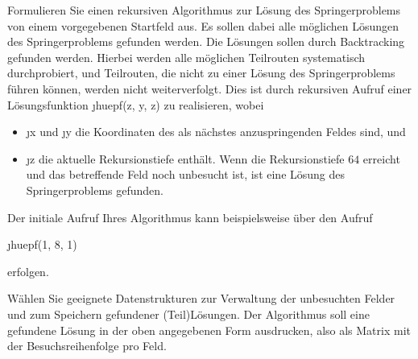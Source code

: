 \documentclass{bschlangaul-aufgabe}
\begin{document}
\noindent
Formulieren Sie einen rekursiven Algorithmus zur Lösung des
Springerproblems von einem vorgegebenen Startfeld aus. Es sollen dabei
alle möglichen Lösungen des Springerproblems gefunden werden. Die
Lösungen sollen durch Backtracking gefunden werden. Hierbei werden alle
möglichen Teilrouten systematisch durchprobiert, und Teilrouten, die
nicht zu einer Lösung des Springerproblems führen können, werden nicht
weiterverfolgt. Dies ist durch rekursiven Aufruf einer Lösungsfunktion
\j{huepf(z, y, z)} zu realisieren, wobei

\begin{itemize}

\item \j{x} und \j{y} die Koordinaten des als nächstes anzuspringenden
Feldes sind, und

\item \j{z} die aktuelle Rekursionstiefe enthält. Wenn die
Rekursionstiefe $64$ erreicht und das betreffende Feld noch unbesucht ist,
ist eine Lösung des Springerproblems gefunden.
\end{itemize}

Der initiale Aufruf Ihres Algorithmus kann beispielsweise über den
Aufruf

\begin{center}
\j{huepf(1, 8, 1)}
\end{center}

erfolgen.

Wählen Sie geeignete Datenstrukturen zur Verwaltung der unbesuchten
Felder und zum Speichern gefundener (Teil)Lösungen. Der Algorithmus soll
eine gefundene Lösung in der oben angegebenen Form ausdrucken, also als
Matrix mit der Besuchsreihenfolge pro Feld.

\begin{bAntwort}
\end{bAntwort}
\end{document}
